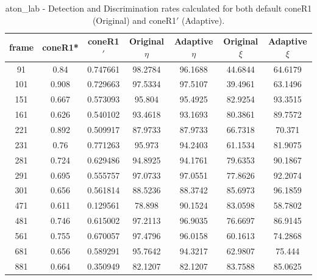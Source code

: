 \begin{appendices}
\begin{table}
\centering
\caption{aton\_lab - Detection and Discrimination rates calculated for both default coneR1 (Original) and coneR1$'$ (Adaptive).}
\begin{tabular}{ |c|c|c|c|c|c|c| }
\hline
\textbf{frame} &  \textbf{coneR1*} &  \textbf{coneR1$'$} &  \textbf{Original $\eta$} &  \textbf{Adaptive $\eta$} &  \textbf{Original $\xi$} &  \textbf{Adaptive $\xi$} \\
\hline
\hline
91 &  0.84 &  0.747661 &  98.2784 &  96.1688 &  44.6844 &  64.6179 \\
\hline
101 &  0.908 &  0.729663 &  97.5334 &  97.5107 &  39.4961 &  63.1496 \\
\hline
151 &  0.667 &  0.573093 &  95.804 &  95.4925 &  82.9254 &  93.3515 \\
\hline
161 &  0.626 &  0.540102 &  93.4618 &  93.1693 &  80.3861 &  89.7572 \\
\hline
221 &  0.892 &  0.509917 &  87.9733 &  87.9733 &  66.7318 &  70.371 \\
\hline
231 &  0.76 &  0.771263 &  95.973 &  94.2403 &  61.1534 &  81.9075 \\
\hline
281 &  0.724 &  0.629486 &  94.8925 &  94.1761 &  79.6353 &  90.1867 \\
\hline
291 &  0.695 &  0.555757 &  97.0733 &  97.0551 &  77.8626 &  92.2074 \\
\hline
301 &  0.656 &  0.561814 &  88.5236 &  88.3742 &  85.6973 &  96.1859 \\
\hline
471 &  0.611 &  0.129561 &  78.898 &  90.1524 &  83.0598 &  58.7802 \\
\hline
481 &  0.746 &  0.615002 &  97.2113 &  96.9035 &  76.6697 &  86.9145 \\
\hline
561 &  0.755 &  0.670057 &  97.4796 &  96.0158 &  60.1613 &  74.2868 \\
\hline
681 &  0.656 &  0.589291 &  95.7642 &  94.3217 &  62.9807 &  75.444 \\
\hline
881 &  0.664 &  0.350949 &  82.1207 &  82.1207 &  83.7588 &  85.0625 \\
\hline
\end{tabular}

\end{table}

\end{appendices}